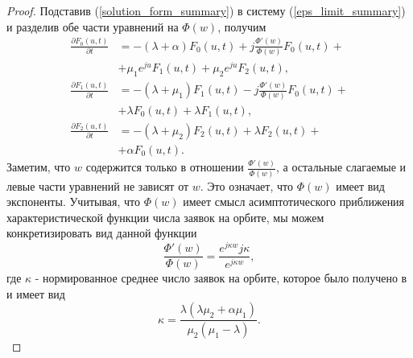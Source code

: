 \begin{proof}
	Подставив (\ref{solution_form_summary}) в систему (\ref{eps_limit_summary}) и разделив обе части уравнений на $\Phi(w)$, получим
	\begin{equation} \label{preresult_summary}
		\begin{split}
			\frac{{\partial F_{0}(u,t)}}{{\partial t}} &= -(\lambda + \alpha)F_{0}(u,t) + j
			\frac{\Phi'(w) }{\Phi(w)}F_{0}(u,t) +\\  &+ \mu_{1} e^{ju}F_{1}(u,t) + \mu_{2}e^{ju}F_{2}(u,t) ,
			\\
			\frac{{\partial F_{1}(u,t)}}{{\partial t}} &= -(\lambda + \mu_{1})F_{1}(u,t) - j 
			\frac{\Phi'(w) }{\Phi(w)}F_{0}(u,t) +\\  &+ \lambda F_{0}(u,t) + \lambda F_{1}(u,t) ,
			\\
			\frac{{\partial F_{2}(u,t)}}{{\partial t}} &= -(\lambda + \mu_{2})F_{2}(u,t)  + \lambda F_{2}(u,t) +\\  &+ \alpha F_{0}(u,t).
		\end{split}
	\end{equation}  
	Заметим, что $w$ содержится только в отношении $\frac{\Phi'(w) }{\Phi(w)}$, а остальные слагаемые и левые части уравнений не зависят от $w$. Это означает, что  $\Phi(w)$ имеет вид экспоненты. Учитывая, что  $\Phi(w)$ имеет смысл асимптотического приближения характеристической функции числа заявок на орбите, мы можем конкретизировать вид данной функции
	\begin{equation*}
		\frac{\Phi'(w) }{\Phi(w)} = \frac{e^{j\kappa w}j\kappa}{e^{j\kappa w}},
	\end{equation*} 
	где $\kappa$ - нормированное среднее число заявок на орбите, которое было получено в \cite{nazarov2017asymptotic} и имеет вид 
	\begin{equation*}
		\kappa = \frac{\lambda(\lambda \mu_{2} + \alpha \mu_{1})}{\mu_{2}(\mu_{1} - \lambda)}.
	\end{equation*}
	

\end{proof}
